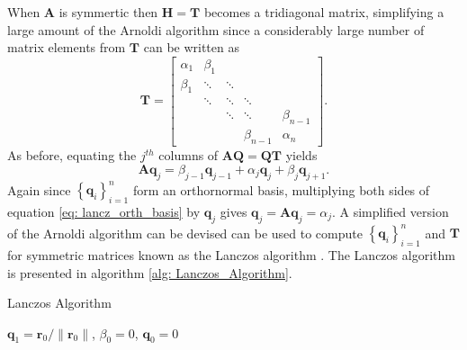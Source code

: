 When $\bm{A}$ is symmertic then $\bm{H} = \bm{T}$ becomes a tridiagonal matrix, simplifying a large amount of the Arnoldi algorithm since a considerably large number of matrix elements from $\bm{T}$ can be written as
\[
    \bm{T} =
    \begin{bmatrix}
        \alpha_1 & \beta_1 &        &             &             \\
        \beta_1  & \ddots  & \ddots &             &             \\
                 & \ddots  & \ddots & \ddots      &             \\
                 &         & \ddots & \ddots      & \beta_{n-1} \\
                 &         &        & \beta_{n-1} & \alpha_{n}
    \end{bmatrix}.
\]
As before, equating the $j^{th}$ columns of $\bm{A} \bm{Q} = \bm{Q} \bm{T}$ yields
\begin{equation}\label{eq: lancz_orth_basis}
    \bm{A} \bm{q}_{j} = \beta_{j-1} \bm{q}_{j-1} + \alpha_{j} \bm{q}_j + \beta_j \bm{q}_{j+1}.
\end{equation}
Again since $\left\{ \bm{q}_{i} \right\}_{i=1}^{n}$ form an orthornormal basis, multiplying both sides of equation \ref{eq: lancz_orth_basis} by $\bm{q}_j$ gives $\bm{q}_j = \bm{A} \bm{q}_j = \alpha_j$. A simplified version of the Arnoldi algorithm can be devised can be used to compute $\left\{ \bm{q}_{i} \right\}_{i=1}^{n}$ and $\bm{T}$ for symmetric matrices known as the Lanczos algorithm \cite{DemmelJamesW1997Anla}. The Lanczos algorithm is presented in algorithm \ref{alg: Lanczos_Algorithm}.

{\centering
\begin{minipage}{.85\linewidth}
    \begin{algorithm}[H]
        \caption{Lanczos Algorithm}
        \label{alg: Lanczos_Algorithm}
        \SetAlgoLined
        \DontPrintSemicolon

        \BlankLine
        $\bm{q}_1 = \bm{r}_0 / \| \bm{r}_0 \|$, $\beta_0 = 0$, $\bm{q}_0 = 0$\;
        \BlankLine
    \end{algorithm}
\end{minipage}
\par
}
